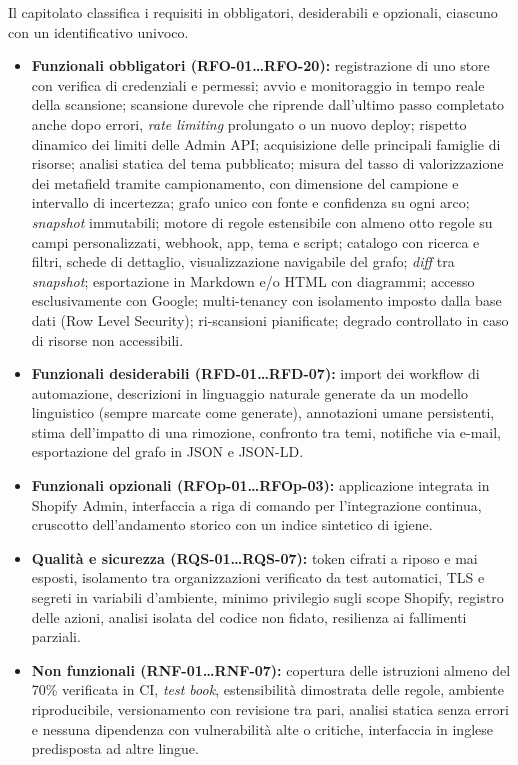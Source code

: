 Il capitolato classifica i requisiti in obbligatori, desiderabili e opzionali, ciascuno con un identificativo univoco.
\begin{itemize}
    \item \textbf{Funzionali obbligatori (\mbox{RFO-01\ldots{}RFO-20}):} registrazione di uno store con verifica di credenziali e permessi; avvio e monitoraggio in tempo reale della scansione; scansione durevole che riprende dall'ultimo passo completato anche dopo errori, \emph{rate limiting} prolungato o un nuovo deploy; rispetto dinamico dei limiti delle Admin API; acquisizione delle principali famiglie di risorse; analisi statica del tema pubblicato; misura del tasso di valorizzazione dei metafield tramite campionamento, con dimensione del campione e intervallo di incertezza; grafo unico con fonte e confidenza su ogni arco; \emph{snapshot} immutabili; motore di regole estensibile con almeno otto regole su campi personalizzati, webhook, app, tema e script; catalogo con ricerca e filtri, schede di dettaglio, visualizzazione navigabile del grafo; \emph{diff} tra \emph{snapshot}; esportazione in Markdown e/o HTML con diagrammi; accesso esclusivamente con Google; multi-tenancy con isolamento imposto dalla base dati (Row Level Security); ri-scansioni pianificate; degrado controllato in caso di risorse non accessibili.
    \item \textbf{Funzionali desiderabili (\mbox{RFD-01\ldots{}RFD-07}):} import dei workflow di automazione, descrizioni in linguaggio naturale generate da un modello linguistico (sempre marcate come generate), annotazioni umane persistenti, stima dell'impatto di una rimozione, confronto tra temi, notifiche via e-mail, esportazione del grafo in JSON e JSON-LD.
    \item \textbf{Funzionali opzionali (\mbox{RFOp-01\ldots{}RFOp-03}):} applicazione integrata in Shopify Admin, interfaccia a riga di comando per l'integrazione continua, cruscotto dell'andamento storico con un indice sintetico di igiene.
    \item \textbf{Qualità e sicurezza (\mbox{RQS-01\ldots{}RQS-07}):} token cifrati a riposo e mai esposti, isolamento tra organizzazioni verificato da test automatici, TLS e segreti in variabili d'ambiente, minimo privilegio sugli scope Shopify, registro delle azioni, analisi isolata del codice non fidato, resilienza ai fallimenti parziali.
    \item \textbf{Non funzionali (\mbox{RNF-01\ldots{}RNF-07}):} copertura delle istruzioni almeno del 70\% verificata in CI, \emph{test book}, estensibilità dimostrata delle regole, ambiente riproducibile, versionamento con revisione tra pari, analisi statica senza errori e nessuna dipendenza con vulnerabilità alte o critiche, interfaccia in inglese predisposta ad altre lingue.
\end{itemize}


